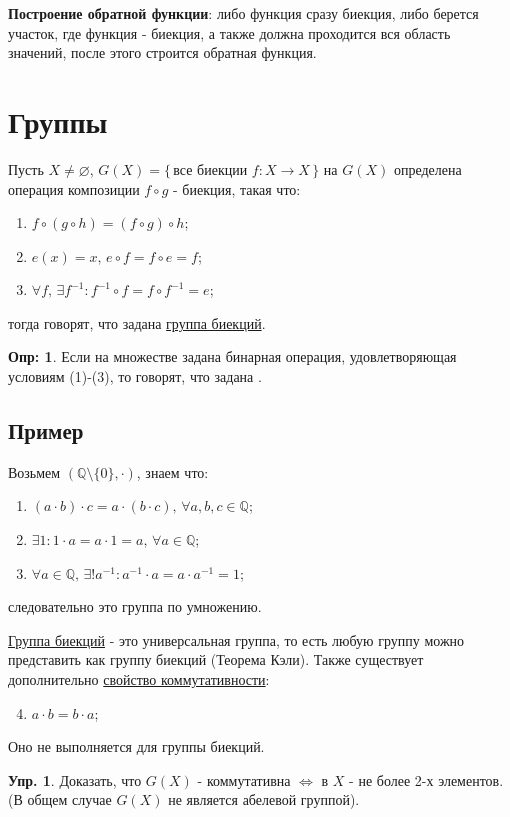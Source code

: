 \documentclass[12pt]{article}
\theoremstyle{definition}
\newtheorem{defn}{Опр:}
\newtheorem{exrc}{Упр.}
\begin{document}
\textbf{Построение обратной функции}: либо функция сразу биекция, либо берется участок, где функция - биекция, а также должна проходится вся область значений, после этого строится обратная функция.

\newpage
\section*{Группы}

Пусть $X \neq \varnothing$, $G(X) = \{\, \text{все биекции } f\colon X \rightarrow X \,\}$ на $G(X)$ определена операция композиции $f\circ g$ - биекция, такая что:
\begin{enumerate}[label={(\arabic*)}]
	\item $f \circ ( g \circ h) = (f \circ g) \circ h$;
	\item $e(x) = x, \, e \circ f = f \circ e = f$;
	\item $\forall f, \, \exists f^{-1} \colon f^{-1} \circ f = f \circ f^{-1} = e$;
\end{enumerate}
тогда говорят, что задана \uline{группа биекций}.

\begin{defn}
Если на множестве задана бинарная операция, удовлетворяющая условиям (1)-(3), то говорят, что задана .
\end{defn}

\subsection*{Пример}
Возьмем $(\mathbb{Q}\setminus \{ 0 \}, \cdot)$, знаем что:
\begin{enumerate}
	\item $ (a \cdot b) \cdot c = a \cdot (b \cdot c), \, \forall a,b,c \in \mathbb{Q}$;
	\item $\exists 1 \colon 1 \cdot a = a \cdot 1 = a, \, \forall a \in \mathbb{Q}$;
	\item $\forall a \in \mathbb{Q}, \, \exists! a^{-1} \colon a^{-1} \cdot a = a \cdot a^{-1} = 1$;
\end{enumerate}
следовательно это группа по умножению. 

\uline{Группа биекций} - это универсальная группа, то есть любую группу можно представить как группу биекций (Теорема Кэли). Также существует дополнительно \uline{свойство коммутативности}:
\begin{enumerate}
\setcounter{enumi}{3}
	\item $ a \cdot b = b \cdot a$;
\end{enumerate}
Оно не выполняется для группы биекций.
\begin{exrc}
	Доказать, что $G(X)$ - коммутативна $\Leftrightarrow$ в $X$ - не более 2-х элементов. (В общем случае $G(X)$ не является абелевой группой).
\end{exrc}
\end{document}
